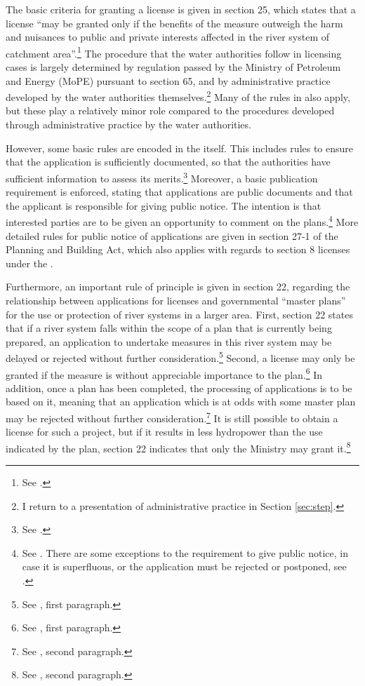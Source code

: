 The basic criteria for granting a license is given in section 25, which states that a license ``may be granted only if the benefits of the measure outweigh the harm and nuisances to public and private interests affected in the river system of catchment area''.\footnote{See \cite[25]{wra00}.} The procedure that the water authorities follow in licensing cases is largely determined by regulation passed by the Ministry of Petroleum and Energy (MoPE) pursuant to section 65, and by administrative practice developed by the water authorities themselves.\footnote{I return to a presentation of administrative practice in Section \ref{sec:step}.} Many of the rules in \cite{ac67} also apply, but these play a relatively minor role compared to the procedures developed through administrative practice by the water authorities.

However, some basic rules are encoded in the \cite{wra00} itself. This includes rules to ensure that the application is sufficiently documented, so that the authorities have sufficient information to assess its merits.\footnote{See \cite[23]{wra00}.} Moreover, a basic publication requirement is enforced, stating that applications are public documents and that the applicant is responsible for giving public notice. The intention is that interested parties are to be given an opportunity to comment on the plans.\footnote{See \cite[24]{wra00}. There are some exceptions to the requirement to give public notice, in case it is superfluous, or the application must be rejected or postponed, see \cite[24a-24c]{wra00}.} More detailed rules for public notice of applications are given in section 27-1 of the Planning and Building Act, which also applies with regards to section 8 licenses under the \cite{wra00}.

Furthermore, an important rule of principle is given in section 22, regarding the relationship between applications for licenses and governmental ``master plans'' for the use or protection of river systems in a larger area. First, section 22 states that if a river system falls within the scope of a plan that is currently being prepared, an application to undertake measures in this river system may be delayed or rejected without further consideration.\footnote{See \cite[22]{wra00}, first paragraph.} Second, a license may only be granted if the measure is without appreciable importance to the plan.\footnote{See \cite[22]{wra00}, first paragraph.} In addition, once a plan has been completed, the processing of applications is to be based on it, meaning that an application which is at odds with some master plan may be rejected without further consideration.\footnote{See \cite[22]{wra00}, second paragraph.} It is still possible to obtain a license for such a project, but if it results in less hydropower than the use indicated by the plan, section 22 indicates that only the Ministry may grant it.\footnote{See \cite[22]{wra00}, second paragraph.}

